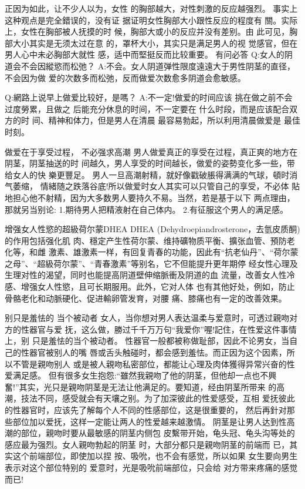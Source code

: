 \documentclass[12pt,UTF8]{ctexbook}
\begin{document}
正因为如此，让不少人以为，女性
的胸部越大，对性刺激的反应越强烈。
事实上这种观点是完全錯误的，没有证
据证明女性胸部大小跟性反应的程度有
關。实际上，女性在胸部被人抚摸的时
候，胸部大或小的反应并没有差别。由
此可见，胸部大小其实是无须太过在意
的，罩杯大小，其实只是满足男人的视
觉感官，但在男人心中未必胸部大就性
感，适中而堅挺反而比较重要。
有问必答
Q:女人的阴道会不会因縱慾而松弛？
A:不会。女人阴道弹性限度遠遠大于男性阴茎的直径，不会因为做
爱的次数多而松弛，反而做爱次数愈多阴道会愈敏感。

Q:網路上说早上做爱比较好，是嗎？
A:不一定!做爱的时间应该
挑在做之前不会过度勞累，且做之
后能充分休息的时间，不一定要在
什么时段，而是应该配合双方的时
间、精神和体力，但是男人在清晨
最容易勃起，所以利用清晨做爱是
最佳时刻。

做爱在于享受过程，
不必强求高潮
男人做爱真正的享受在过程，真正爽的地方在阴茎，阴茎抽送的时
间越久，男人享受的时间越长，做爱的姿勢变化多一些，带给女人的快
樂更豐足。
男人一旦高潮射精，就好像戳破脹得满满的气球，頓时消气萎缩，
情緒随之跌落谷底!所以做爱时女人其实可以只管自己的享受，不必体
貼地担心他不射精，因为大多数男人要持久不易。当然，若是基于以下
两点理由，那就另当别论:
1.期待男人把精液射在自己体内。
2.有征服这个男人的满足感。

增强女人性慾的超級荷尔蒙DHEA
DHEA (Dehydroepiandrosterone，去氫皮质酮)的作用包括强化肌
肉、穩定产生性荷尔蒙、维持礦物质平衡、擴张血管、預防老化等，和雌
激素、雄激素一样，有回复青春的功能，因此有“抗老仙丹”、“荷尔蒙
之母”、“超級荷尔蒙”、“青春激素”等别名，它不但能提升更年期停
经女性心理及生理对性的渴望，同时也能提高阴道壁伸缩脈衝及阴道的血
流量，改善女人性冷感、增强女人性慾，且可长期服用。此外，它对人体
也有其他好处，例如，防止骨骼老化和动脈硬化、促进輸卵管发育，对腰
痛、膝痛也有一定的改善效果。

别只是羞怯的
当个被动者
女人，当你想对男人表达温柔与爱意时，可透过親吻对方的性器官与爱
抚，这么做，勝过千千万万句“我爱你”喔!記住，在性爱这件事情上，别
只是羞怯的当个被动者。
性器官一般都被称做耻部，因此不论男女，当自己的性器官被别人的嘴
唇或舌头触碰时，都会感到羞怯。而正因为这个因素，所以不管是親吻别人
或是被人親吻私密部位，都能让心理及肉体獲得异常兴奋的性爱满足感。
但有很多女生抱怨:“雖然我親吻了他的阴茎，但他却一点也不興
奮!”其实，光只是親吻阴茎是无法让他满足的。要知道，经由阴茎所带来
的高潮，技法不同，感受就会有天壤之别。为了加深彼此的性爱感受，互相
爱抚彼此的性器官时，应该先了解每个人不同的性感部位，这是很重要的，
然后再針对那些部位加以爱抚，这样一定能让两人的性爱越来越激情。
阴茎是让男人达到性高潮的部位，親吻时要从最敏感的阴茎内侧包
皮繫带开始，龟头冠、龟头沟等处的
感应最为强烈。女人親吻勃起的阴茎
时，大部分都只是親吻阴茎的前端而
已，其实这个前端部位，即使加以捏
按、吸吮，也不会有感觉，所以如果
女生要向男生表示对这个部位特别的
爱意时，光是吸吮前端部位，只会给
对方带来疼痛的感觉而已!
\end{document}
